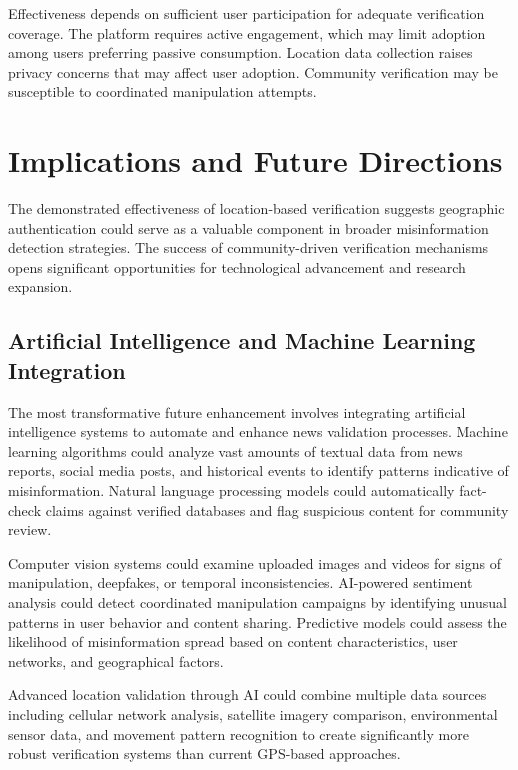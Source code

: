 Effectiveness depends on sufficient user participation for adequate verification coverage. The platform requires active engagement, which may limit adoption among users preferring passive consumption. Location data collection raises privacy concerns that may affect user adoption. Community verification may be susceptible to coordinated manipulation attempts.

\section{Implications and Future Directions}
\label{sec:implications}

The demonstrated effectiveness of location-based verification suggests geographic authentication could serve as a valuable component in broader misinformation detection strategies. The success of community-driven verification mechanisms opens significant opportunities for technological advancement and research expansion.

\subsection{Artificial Intelligence and Machine Learning Integration}
\label{subsec:ai_ml_integration}

The most transformative future enhancement involves integrating artificial intelligence systems to automate and enhance news validation processes. Machine learning algorithms could analyze vast amounts of textual data from news reports, social media posts, and historical events to identify patterns indicative of misinformation. Natural language processing models could automatically fact-check claims against verified databases and flag suspicious content for community review.

Computer vision systems could examine uploaded images and videos for signs of manipulation, deepfakes, or temporal inconsistencies. AI-powered sentiment analysis could detect coordinated manipulation campaigns by identifying unusual patterns in user behavior and content sharing. Predictive models could assess the likelihood of misinformation spread based on content characteristics, user networks, and geographical factors.

Advanced location validation through AI could combine multiple data sources including cellular network analysis, satellite imagery comparison, environmental sensor data, and movement pattern recognition to create significantly more robust verification systems than current GPS-based approaches.

